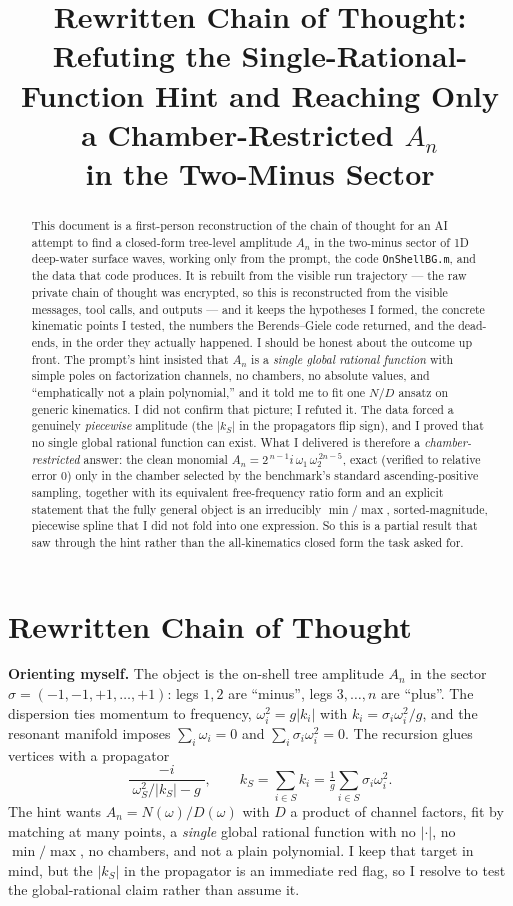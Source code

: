 \documentclass[11pt]{article}
\title{Rewritten Chain of Thought: Refuting the Single-Rational-Function Hint
and Reaching Only a Chamber-Restricted $A_n$\\
in the Two-Minus Sector}
\author{}
\date{}
\begin{document}
\maketitle

\begin{abstract}
\noindent This document is a first-person reconstruction of the chain of thought for an
AI attempt to find a closed-form tree-level amplitude $A_n$ in the two-minus sector of
1D deep-water surface waves, working only from the prompt, the code \texttt{OnShellBG.m},
and the data that code produces. It is rebuilt from the visible run trajectory --- the
raw private chain of thought was encrypted, so this is reconstructed from the visible
messages, tool calls, and outputs --- and it keeps the hypotheses I formed, the concrete
kinematic points I tested, the numbers the Berends--Giele code returned, and the
dead-ends, in the order they actually happened. I should be honest about the outcome
up front. The prompt's hint insisted that $A_n$ is a \emph{single global rational
function} with simple poles on factorization channels, no chambers, no absolute values,
and ``emphatically not a plain polynomial,'' and it told me to fit one $N/D$ ansatz on
generic kinematics. I did not confirm that picture; I refuted it. The data forced a
genuinely \emph{piecewise} amplitude (the $|k_S|$ in the propagators flip sign), and I
proved that no single global rational function can exist. What I delivered is therefore a
\emph{chamber-restricted} answer: the clean monomial
$A_n=2^{\,n-1}i\,\omega_1\,\omega_2^{\,2n-5}$, exact (verified to relative error $0$)
only in the chamber selected by the benchmark's standard ascending-positive sampling,
together with its equivalent free-frequency ratio form and an explicit statement that the
fully general object is an irreducibly $\min/\max$, sorted-magnitude, piecewise spline
that I did not fold into one expression. So this is a partial result that saw through the
hint rather than the all-kinematics closed form the task asked for.
\end{abstract}

\section*{Rewritten Chain of Thought}

\noindent\textbf{Orienting myself.}
The object is the on-shell tree amplitude $A_n$ in the sector
$\sigma=(-1,-1,+1,\dots,+1)$: legs $1,2$ are ``minus'', legs $3,\dots,n$ are ``plus''.
The dispersion ties momentum to frequency, $\omega_i^2 = g|k_i|$ with
$k_i = \sigma_i\omega_i^2/g$, and the resonant manifold imposes $\sum_i\omega_i=0$ and
$\sum_i\sigma_i\omega_i^2=0$. The recursion glues vertices with a propagator
\[
\frac{-i}{\;\omega_S^2/|k_S|-g\;},\qquad
k_S=\sum_{i\in S}k_i=\tfrac1g\sum_{i\in S}\sigma_i\omega_i^2 .
\]
The hint wants $A_n=N(\omega)/D(\omega)$ with $D$ a product of channel factors, fit by
matching at many points, a \emph{single} global rational function with no $|\cdot|$, no
$\min/\max$, no chambers, and not a plain polynomial. I keep that target in mind, but the
$|k_S|$ in the propagator is an immediate red flag, so I resolve to test the global-rational
claim rather than assume it.
\end{document}
